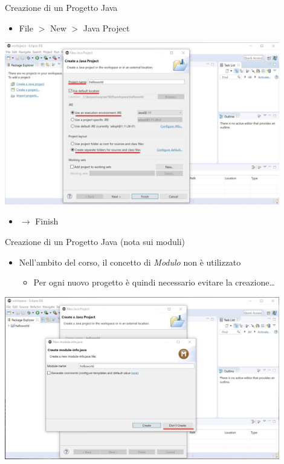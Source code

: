 \documentclass[presentation]{beamer}
\begin{document}
\begin{frame}{Creazione di un Progetto Java}
\begin{itemize}
\item File $>$ New $>$ Java Project
\end{itemize}
\begin{center}
\includegraphics[width=0.9\textwidth]{img/eclipse-screenshots/eclipse-ide-02a.jpg}
\end{center}
\begin{itemize}
\item $\rightarrow$ Finish
\end{itemize}
\end{frame}

\begin{frame}{Creazione di un Progetto Java (nota sui moduli)}
\begin{itemize}
\item Nell'ambito del corso, il concetto di \emph{Modulo} non è utilizzato
\begin{itemize}
\item Per ogni nuovo progetto è quindi necessario evitare la creazione\dots
\end{itemize}
\end{itemize}
\begin{center}
\includegraphics[width=0.9\textwidth]{img/eclipse-screenshots/eclipse-ide-02b.jpg}
\end{center}
\end{frame}
\end{document}
